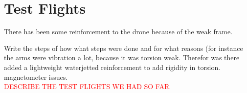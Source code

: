 \chapter{Test Flights} \label{ch:test}
There has been some reinforcement to the drone because of the weak frame. 

Write the steps of how what steps were done and for what reasons (for instance the arms were vibration a lot, because it was torsion weak. Therefor was there added a lightweight waterjetted reinforcement to add rigidity in torsion.\\

magnetometer issues.\\

\textcolor{red}{DESCRIBE THE TEST FLIGHTS WE HAD SO FAR}

